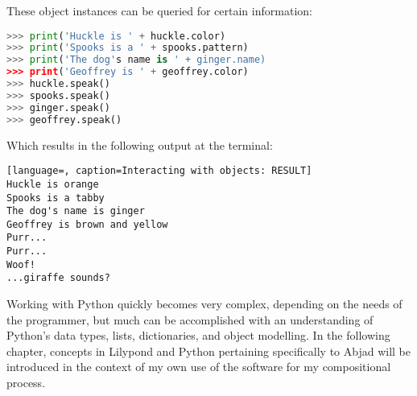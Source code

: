 These object instances can be queried for certain information:

\singlespace
\begin{lstlisting}[language=Python, caption=Interacting with objects]
>>> print('Huckle is ' + huckle.color)
>>> print('Spooks is a ' + spooks.pattern)
>>> print('The dog's name is ' + ginger.name)
>>> print('Geoffrey is ' + geoffrey.color)
>>> huckle.speak()
>>> spooks.speak()
>>> ginger.speak()
>>> geoffrey.speak()
\end{lstlisting}
\doublespace

Which results in the following output at the terminal:

\singlespace
\begin{lstlisting}[language=, caption=Interacting with objects: RESULT]
Huckle is orange
Spooks is a tabby
The dog's name is ginger
Geoffrey is brown and yellow
Purr...
Purr...
Woof!
...giraffe sounds?
\end{lstlisting}
\doublespace

Working with Python quickly becomes very complex, depending on the needs of the programmer, but much can be accomplished with an understanding of Python's data types, lists, dictionaries, and object modelling. In the following chapter, concepts in Lilypond and Python pertaining specifically to Abjad will be introduced in the context of my own use of the software for my compositional process.

\singlespace